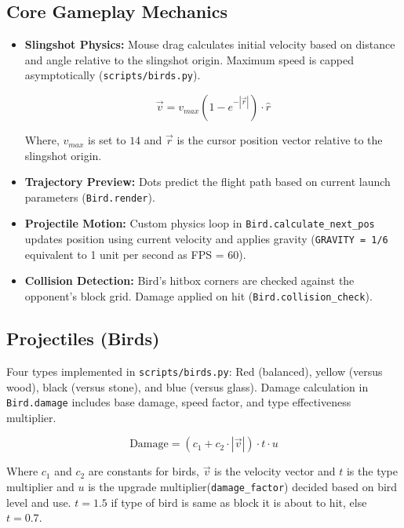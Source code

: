 \documentclass[11pt, a4paper]{article}
\begin{document}
\subsection{Core Gameplay Mechanics}

\begin{itemize}

    \item \textbf{Slingshot Physics:} Mouse drag calculates initial velocity based on distance and angle relative to the slingshot origin. Maximum speed is capped asymptotically (\texttt{scripts/birds.py}).
    
    \[\vec{v}=v_{max}(1-e^{-|\vec{r}|})\cdot\hat{r}\]
    
    Where, $v_{max}$ is set to $14$ and $\vec{r}$ is the cursor position vector relative to the slingshot origin.
    
    \item \textbf{Trajectory Preview:} Dots predict the flight path based on current launch parameters (\texttt{Bird.render}).
    
    \item \textbf{Projectile Motion:} Custom physics loop in \texttt{Bird.calculate\_next\_pos} updates position using current velocity and applies gravity (\texttt{GRAVITY = 1/6} equivalent to 1 unit per second as FPS = 60).
    
    \item \textbf{Collision Detection:} Bird's hitbox corners are checked against the opponent's block grid. Damage applied on hit (\texttt{Bird.collision\_check}).

\end{itemize}

\vspace{1cm}

\subsection{Projectiles (Birds)}
\label{sec:projectiles}

Four types implemented in \texttt{scripts/birds.py}: Red (balanced), yellow (versus wood), black (versus stone), and blue (versus glass). Damage calculation in \texttt{Bird.damage} includes base damage, speed factor, and type effectiveness multiplier.

\[\text{Damage}=(c_1+c_2\cdot|\vec{v}|)\cdot t\cdot u\]

Where $c_1$ and $c_2$ are constants for birds, $\vec{v}$ is the velocity vector and $t$ is the type multiplier and $u$ is the upgrade multiplier(\texttt{damage\_factor}) decided based on bird level and use. $t=1.5$ if type of bird is same as block it is about to hit, else $t=0.7$.
\end{document}
